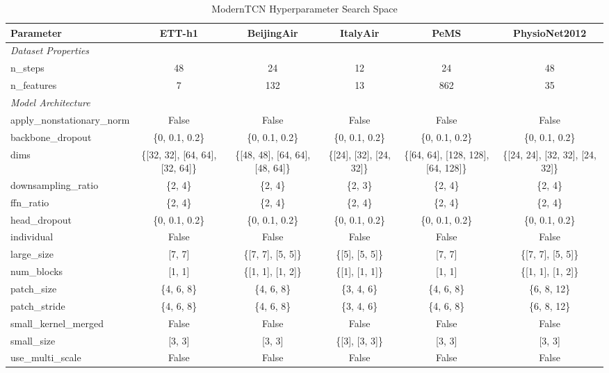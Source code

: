 \begin{table}[H]
\centering
\caption{ModernTCN Hyperparameter Search Space}
\label{tab:hyperparam_moderntcn}
\begin{adjustbox}{max width=\textwidth}
\begin{small}
\begin{tabular}{l|ccccc}
\toprule
\textbf{Parameter} & \textbf{ETT-h1} & \textbf{BeijingAir} & \textbf{ItalyAir} & \textbf{PeMS} & \textbf{PhysioNet2012} \\
\midrule
\multicolumn{6}{l}{\textit{Dataset Properties}} \\
n\_steps & 48 & 24 & 12 & 24 & 48 \\
n\_features & 7 & 132 & 13 & 862 & 35 \\
\midrule
\multicolumn{6}{l}{\textit{Model Architecture}} \\
apply\_nonstationary\_norm & False & False & False & False & False \\
backbone\_dropout & \{0, 0.1, 0.2\} & \{0, 0.1, 0.2\} & \{0, 0.1, 0.2\} & \{0, 0.1, 0.2\} & \{0, 0.1, 0.2\} \\
dims & \{[32, 32], [64, 64], [32, 64]\} & \{[48, 48], [64, 64], [48, 64]\} & \{[24], [32], [24, 32]\} & \{[64, 64], [128, 128], [64, 128]\} & \{[24, 24], [32, 32], [24, 32]\} \\
downsampling\_ratio & \{2, 4\} & \{2, 4\} & \{2, 3\} & \{2, 4\} & \{2, 4\} \\
ffn\_ratio & \{2, 4\} & \{2, 4\} & \{2, 4\} & \{2, 4\} & \{2, 4\} \\
head\_dropout & \{0, 0.1, 0.2\} & \{0, 0.1, 0.2\} & \{0, 0.1, 0.2\} & \{0, 0.1, 0.2\} & \{0, 0.1, 0.2\} \\
individual & False & False & False & False & False \\
large\_size & [7, 7] & \{[7, 7], [5, 5]\} & \{[5], [5, 5]\} & [7, 7] & \{[7, 7], [5, 5]\} \\
num\_blocks & [1, 1] & \{[1, 1], [1, 2]\} & \{[1], [1, 1]\} & [1, 1] & \{[1, 1], [1, 2]\} \\
patch\_size & \{4, 6, 8\} & \{4, 6, 8\} & \{3, 4, 6\} & \{4, 6, 8\} & \{6, 8, 12\} \\
patch\_stride & \{4, 6, 8\} & \{4, 6, 8\} & \{3, 4, 6\} & \{4, 6, 8\} & \{6, 8, 12\} \\
small\_kernel\_merged & False & False & False & False & False \\
small\_size & [3, 3] & [3, 3] & \{[3], [3, 3]\} & [3, 3] & [3, 3] \\
use\_multi\_scale & False & False & False & False & False \\

\end{tabular}
\end{small}
\end{adjustbox}
\end{table}
